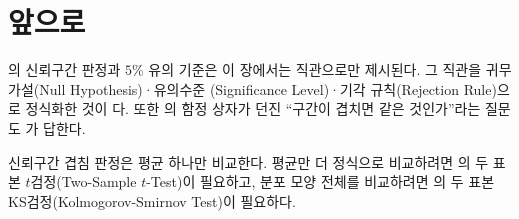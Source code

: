 \section{앞으로}
\label{sec:vis-future}

의 신뢰구간 판정과 $5\%$ 유의 기준은 이 장에서는
직관으로만 제시된다. 그 직관을 귀무가설(Null Hypothesis)·유의수준
(Significance Level)·기각 규칙(Rejection Rule)으로 정식화한 것이
다. 또한 의 함정 상자가 던진
``구간이 겹치면 같은 것인가''라는 질문도 가 답한다.

신뢰구간 겹침 판정은 평균 하나만 비교한다. 평균만 더 정식으로 비교하려면
의 두 표본 $t$검정(Two-Sample $t$-Test)이 필요하고,
분포 모양 전체를 비교하려면 의 두 표본
KS검정(Kolmogorov-Smirnov Test)이 필요하다.
